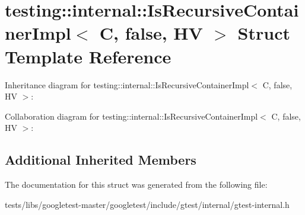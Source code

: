 \hypertarget{structtesting_1_1internal_1_1IsRecursiveContainerImpl_3_01C_00_01false_00_01HV_01_4}{}\section{testing\+:\+:internal\+:\+:Is\+Recursive\+Container\+Impl$<$ C, false, HV $>$ Struct Template Reference}
\label{structtesting_1_1internal_1_1IsRecursiveContainerImpl_3_01C_00_01false_00_01HV_01_4}


Inheritance diagram for testing\+:\+:internal\+:\+:Is\+Recursive\+Container\+Impl$<$ C, false, HV $>$\+:


Collaboration diagram for testing\+:\+:internal\+:\+:Is\+Recursive\+Container\+Impl$<$ C, false, HV $>$\+:
\subsection*{Additional Inherited Members}


The documentation for this struct was generated from the following file\+:\begin{DoxyCompactItemize}
\item 
tests/libs/googletest-\/master/googletest/include/gtest/internal/gtest-\/internal.\+h\end{DoxyCompactItemize}
